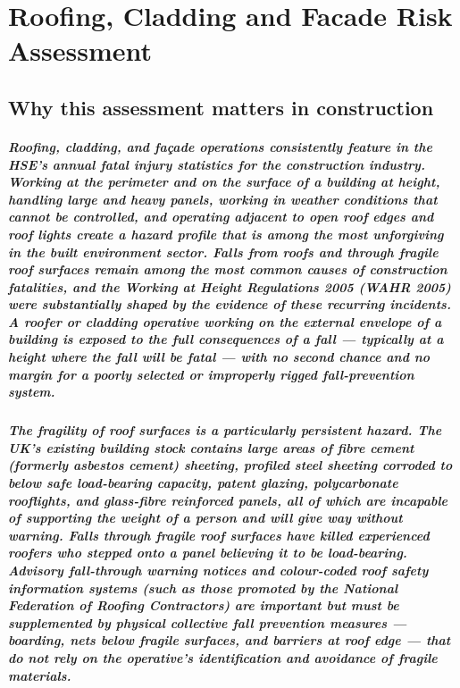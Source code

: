 \chapter{Roofing, Cladding and Facade Risk Assessment}
\label{chap:Roofing, Cladding and Facade Risk Assessment}

\section{Why this assessment matters in construction}

\paragraph{Roofing, cladding, and façade operations consistently feature in the HSE's annual fatal injury statistics for the construction industry. Working at the perimeter and on the surface of a building at height, handling large and heavy panels, working in weather conditions that cannot be controlled, and operating adjacent to open roof edges and roof lights create a hazard profile that is among the most unforgiving in the built environment sector. Falls from roofs and through fragile roof surfaces remain among the most common causes of construction fatalities, and the Working at Height Regulations 2005 (WAHR 2005) were substantially shaped by the evidence of these recurring incidents. A roofer or cladding operative working on the external envelope of a building is exposed to the full consequences of a fall --- typically at a height where the fall will be fatal --- with no second chance and no margin for a poorly selected or improperly rigged fall-prevention system.}

\paragraph{The fragility of roof surfaces is a particularly persistent hazard. The UK's existing building stock contains large areas of fibre cement (formerly asbestos cement) sheeting, profiled steel sheeting corroded to below safe load-bearing capacity, patent glazing, polycarbonate rooflights, and glass-fibre reinforced panels, all of which are incapable of supporting the weight of a person and will give way without warning. Falls through fragile roof surfaces have killed experienced roofers who stepped onto a panel believing it to be load-bearing. Advisory fall-through warning notices and colour-coded roof safety information systems (such as those promoted by the National Federation of Roofing Contractors) are important but must be supplemented by physical collective fall prevention measures --- boarding, nets below fragile surfaces, and barriers at roof edge --- that do not rely on the operative's identification and avoidance of fragile materials.}

